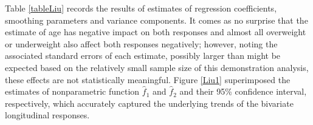 \documentclass[12pt, notitlepage]{article}
\begin{document}



Table \ref{tableLiu} records the results of estimates of regression coefficients, smoothing parameters and variance components. It comes as no surprise that the estimate of age has negative impact on both responses and almost all overweight or underweight also affect  both responses negatively; however, noting the associated standard errors of each estimate, possibly larger than might be expected based on the relatively small sample size of this demonstration analysis, these effects are not statistically meaningful. 
Figure \ref{Liu1} superimposed the estimates of nonparametric function $\hat f_1$ and $\hat f_2$ and their 95\% confidence interval, respectively, which accurately captured the underlying trends of the bivariate longitudinal responses.


%
%
%
\end{document}

